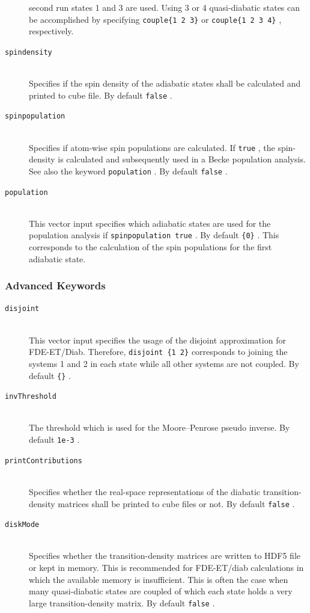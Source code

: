 \documentclass[bibliography=totocnumbered,a4paper,10pt,oneside]{scrbook}
\newcommand{\ttt}[1]{%
  \begingroup\setlength{\fboxsep}{1pt}%
  \colorbox{serenity-green!30}{\texttt{\hspace*{2pt}\vphantom{(g}#1\hspace*{2pt}}}%
  \endgroup
}
\begin{document}
\begin{description}
  second run states 1 and 3 are used. Using 3 or 4 quasi-diabatic states can be accomplished by specifying
  \ttt{couple\{1 2 3\}} or \ttt{couple\{1 2 3 4\}}, respectively.
  \item [\texttt{spindensity}]\hfill \\
  Specifies if the spin density of the adiabatic states shall be calculated and printed to cube file. By default \ttt{false}.
  \item [\texttt{spinpopulation}]\hfill \\
  Specifies if atom-wise spin populations are calculated. If \ttt{true}, the spin-density is calculated and subsequently
  used in a Becke population analysis. See also the keyword \ttt{population}. By default \ttt{false}.
  \item [\texttt{population}]\hfill \\
  This vector input specifies which adiabatic states are used for the population analysis if \ttt{spinpopulation true}. By default \ttt{\{0\}}. This corresponds to the calculation of the spin populations for the first adiabatic state.
\end{description}
\subsubsection{Advanced Keywords}
\begin{description}
  \item [\texttt{disjoint}]\hfill \\
  This vector input specifies the usage of the disjoint approximation for FDE-ET/Diab. Therefore, \ttt{disjoint \{1 2\}} corresponds to joining
  the systems 1 and 2 in each state while all other systems are not coupled. By default \ttt{\{\}}.
  \item [\texttt{invThreshold}]\hfill \\
  The threshold which is used for the Moore--Penrose pseudo inverse. By default \ttt{1e-3}.
  \item [\texttt{printContributions}]\hfill \\
  Specifies whether the real-space representations of the diabatic transition-density matrices shall be printed to cube
  files or not. By default \ttt{false}.
  \item [\texttt{diskMode}]\hfill \\
  Specifies whether the transition-density matrices are written to HDF5 file or kept in memory. This is recommended for FDE-ET/diab calculations in which the available memory is insufficient.
  This is often the case when many quasi-diabatic states are coupled of which each state holds a very large transition-density matrix. By default \ttt{false}.

\end{description}
\end{document}
